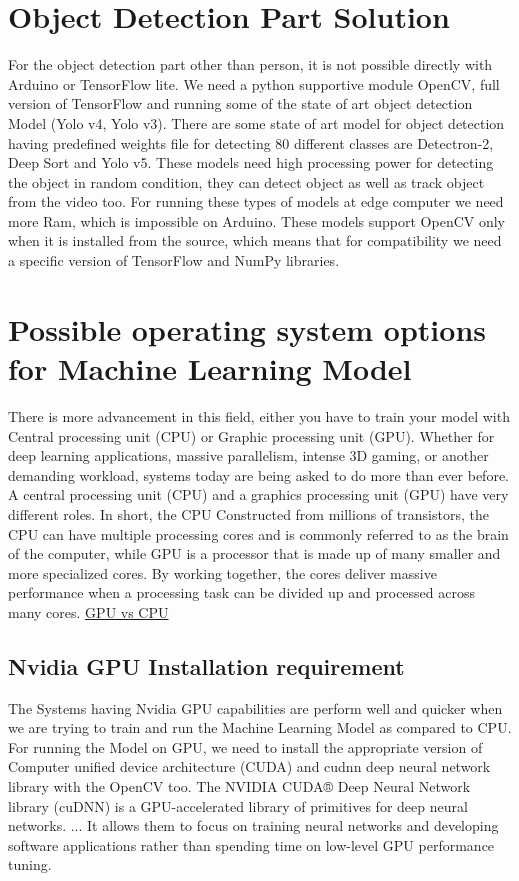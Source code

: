 \section{Object Detection Part Solution}
For the object detection part other than person, it is not possible directly with Arduino or TensorFlow lite. We need a python supportive module OpenCV, full version of TensorFlow and running some of the state of art object detection Model (Yolo v4, Yolo v3). There are some state of art model for object detection having predefined weights file for detecting 80 different classes are Detectron-2, Deep Sort and Yolo v5. These models need high processing power for detecting the object in random condition, they can detect object as well as track object from the video too. For running these types of models at edge computer we need more Ram, which is impossible on Arduino. These models support OpenCV only when it is installed from the source, which means that for compatibility we need a specific version of TensorFlow and NumPy libraries. 
\section{Possible operating system options for Machine Learning Model}
There is more advancement in this field, either you have to train your model with Central processing unit (CPU) or Graphic processing unit (GPU). Whether for deep learning applications, massive parallelism, intense 3D gaming, or another demanding workload, systems today are being asked to do more than ever before. A central processing unit (CPU) and a graphics processing unit (GPU) have very different roles. In short, the CPU Constructed from millions of transistors, the CPU can have multiple processing cores and is commonly referred to as the brain of the computer, while GPU is a processor that is made up of many smaller and more specialized cores. By working together, the cores deliver massive performance when a processing task can be divided up and processed across many cores. \href{https://www.intel.com/content/www/us/en/products/docs/processors/cpu-vs-gpu.html} {GPU vs CPU}
\subsection{Nvidia GPU Installation requirement}
The Systems having Nvidia GPU capabilities are perform well and quicker when we are trying to train and run the Machine Learning Model as compared to CPU. For running the Model on GPU, we need to install the appropriate version of Computer unified device architecture (CUDA) and cudnn deep neural network library with the OpenCV too. The NVIDIA CUDA® Deep Neural Network library (cuDNN) is a GPU-accelerated library of primitives for deep neural networks. ... It allows them to focus on training neural networks and developing software applications rather than spending time on low-level GPU performance tuning. 

